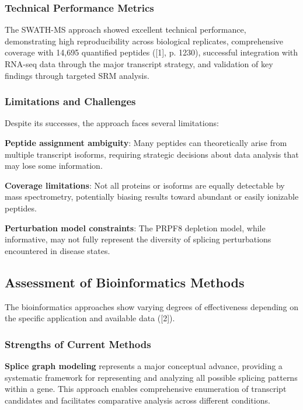 \documentclass[12pt,a4paper]{article}
\begin{document}
\subsubsection{Technical Performance Metrics}

The SWATH-MS approach showed excellent technical performance, demonstrating high reproducibility across biological replicates, comprehensive coverage with 14,695 quantified peptides ([1], p. 1230), successful integration with RNA-seq data through the major transcript strategy, and validation of key findings through targeted SRM analysis.

\subsubsection{Limitations and Challenges}

Despite its successes, the approach faces several limitations:

\textbf{Peptide assignment ambiguity}: Many peptides can theoretically arise from multiple transcript isoforms, requiring strategic decisions about data analysis that may lose some information.

\textbf{Coverage limitations}: Not all proteins or isoforms are equally detectable by mass spectrometry, potentially biasing results toward abundant or easily ionizable peptides.

\textbf{Perturbation model constraints}: The PRPF8 depletion model, while informative, may not fully represent the diversity of splicing perturbations encountered in disease states.

\subsection{Assessment of Bioinformatics Methods}

The bioinformatics approaches show varying degrees of effectiveness depending on the specific application and available data ([2]).

\subsubsection{Strengths of Current Methods}

\textbf{Splice graph modeling} represents a major conceptual advance, providing a systematic framework for representing and analyzing all possible splicing patterns within a gene. This approach enables comprehensive enumeration of transcript candidates and facilitates comparative analysis across different conditions.
\end{document}
